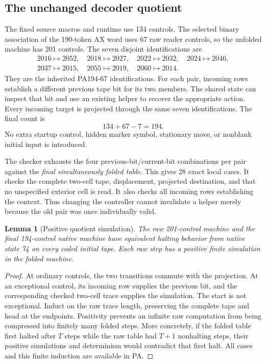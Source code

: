 \documentclass[11pt,letterpaper]{article}
\newtheorem{lemma}[theorem]{Lemma}
\begin{document}
\subsection{The unchanged decoder quotient}

The fixed source macros and runtime use 134 controls. The selected binary
association of the 190-token AX word uses 67 raw reader controls, so the
unfolded machine has 201 controls. The seven disjoint identifications are
\[
\begin{gathered}
2016\mapsto2052,\quad2018\mapsto2027,\quad2022\mapsto2032,\quad
2024\mapsto2046,\\
2037\mapsto2015,\quad2055\mapsto2019,\quad2060\mapsto2014.
\end{gathered}
\]
They are the inherited PA194-67 identifications. For each pair, incoming
rows establish a different previous tape bit for its two members. The
shared state can inspect that bit and use an existing helper to recover
the appropriate action. Every incoming target is projected through the
same seven identifications. The final count is
\[
                    134+67-7=194.
\]
No extra startup control, hidden marker symbol, stationary move, or
nonblank initial input is introduced.

The checker exhausts the four previous-bit/current-bit combinations per
pair against the \emph{final simultaneously folded table}. This gives
28 exact local cases. It checks the complete two-cell tape, displacement,
projected destination, and that no unspecified exterior cell is read.
It also checks all incoming rows establishing the context. Thus changing
the controller cannot invalidate a helper merely because the old pair
was once individually valid.

\begin{lemma}[Positive quotient simulation]
The raw 201-control machine and the final 194-control native machine have
equivalent halting behavior from native state 74 on every coded initial
tape. Each raw step has a positive finite simulation in the folded machine.
\end{lemma}
\begin{proof}
At ordinary controls, the two transitions commute with the projection.
At an exceptional control, its incoming row supplies the previous bit,
and the corresponding checked two-cell trace supplies the simulation.
The start is not exceptional. Induct on the raw trace length, preserving
the complete tape and head at the endpoints. Positivity prevents an
infinite raw computation from being compressed into finitely many folded
steps. More concretely, if the folded table first halted after $T$ steps
while the raw table had $T+1$ nonhalting steps, their positive simulations
and determinism would contradict that first halt. All cases and this
finite induction are available in PA.
\end{proof}
\end{document}
